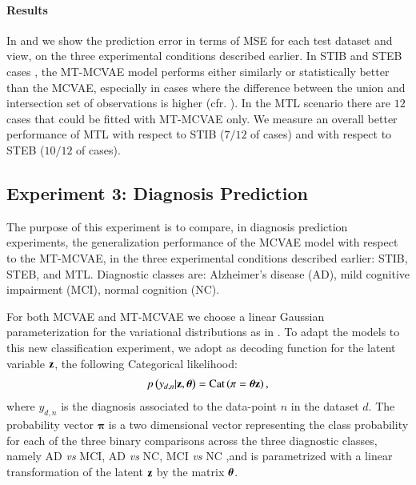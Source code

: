

\paragraph{Results}
In  and  we show the prediction error in terms of MSE for each test dataset and view, on the three experimental conditions described earlier.
In STIB and STEB cases , the MT-MCVAE model performs either similarly or statistically better than the MCVAE, especially in cases where the difference between the union and intersection set of observations is higher (cfr. ).
In the MTL scenario  there are $12$ cases that could be fitted with MT-MCVAE only.
We measure an overall better performance of MTL with respect to STIB ($7/12$ of cases) and with respect to STEB ($10/12$ of cases).

\subsection{Experiment 3: Diagnosis Prediction}
\label{ssec:classifier}


The purpose of this experiment is to compare, in diagnosis prediction experiments, the generalization performance of the MCVAE model with respect to the MT-MCVAE,
in the three experimental conditions described earlier: STIB, STEB, and MTL.
%
Diagnostic classes are:
Alzheimer's disease (AD),
mild cognitive impairment (MCI),
normal cognition (NC).

For both MCVAE and MT-MCVAE we choose a linear Gaussian parameterization for the variational distributions as in .
To adapt the models to this new classification experiment, we adopt as decoding function for the latent variable $\mathbf{z}$, the following Categorical likelihood:
\begin{align}
\label{eq:classifier}
p\left(y_{d,n}|\mathbf{z},\boldsymbol{\theta}\right) = \operatorname{Cat}\left(\mathbf{\pi}=\boldsymbol{\theta}\mathbf{z}\right),
\end{align}
where $y_{d,n}$ is the diagnosis associated to the data-point $n$ in the dataset $d$.
The probability vector $\mathbf{\pi}$ is a two dimensional vector representing the class probability for each of the three binary comparisons across the three diagnostic classes, namely AD \textit{vs} MCI, AD \textit{vs} NC, MCI \textit{vs} NC ,and is parametrized with a linear transformation of the latent $\mathbf{z}$ by the matrix $\boldsymbol{\theta}$.

